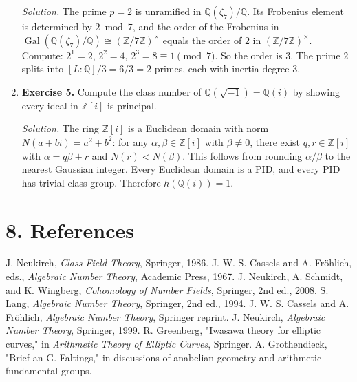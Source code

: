\begin{enumerate}[leftmargin=*,itemsep=0.9em]
\emph{Solution.} The prime $p=2$ is unramified in $\mathbb{Q}(\zeta_7)/\mathbb{Q}$. Its Frobenius element is determined by $2\bmod 7$, and the order of the Frobenius in $\operatorname{Gal}(\mathbb{Q}(\zeta_7)/\mathbb{Q})\cong(\mathbb{Z}/7\mathbb{Z})^\times$ equals the order of $2$ in $(\mathbb{Z}/7\mathbb{Z})^\times$. Compute: $2^1=2$, $2^2=4$, $2^3=8\equiv 1\pmod 7$. So the order is 3. The prime $2$ splits into $[L:\mathbb{Q}]/3=6/3=2$ primes, each with inertia degree $3$.

\item \textbf{Exercise 5.} Compute the class number of $\mathbb{Q}(\sqrt{-1})=\mathbb{Q}(i)$ by showing every ideal in $\mathbb{Z}[i]$ is principal.

\emph{Solution.} The ring $\mathbb{Z}[i]$ is a Euclidean domain with norm $N(a+bi)=a^2+b^2$: for any $\alpha,\beta\in\mathbb{Z}[i]$ with $\beta\ne 0$, there exist $q,r\in\mathbb{Z}[i]$ with $\alpha=q\beta+r$ and $N(r)<N(\beta)$. This follows from rounding $\alpha/\beta$ to the nearest Gaussian integer. Every Euclidean domain is a PID, and every PID has trivial class group. Therefore $h(\mathbb{Q}(i))=1$.

\end{enumerate}
\section*{8. References}


\begin{thebibliography}{9}
 J. Neukirch, \emph{Class Field Theory}, Springer, 1986.
 J. W. S. Cassels and A. Fröhlich, eds., \emph{Algebraic Number Theory}, Academic Press, 1967.
 J. Neukirch, A. Schmidt, and K. Wingberg, \emph{Cohomology of Number Fields}, Springer, 2nd ed., 2008.
 S. Lang, \emph{Algebraic Number Theory}, Springer, 2nd ed., 1994.
 J. W. S. Cassels and A. Fröhlich, \emph{Algebraic Number Theory}, Springer reprint.
 J. Neukirch, \emph{Algebraic Number Theory}, Springer, 1999.
 R. Greenberg, "Iwasawa theory for elliptic curves," in \emph{Arithmetic Theory of Elliptic Curves}, Springer.
 A. Grothendieck, "Brief an G. Faltings," in discussions of anabelian geometry and arithmetic fundamental groups.
\end{thebibliography}
